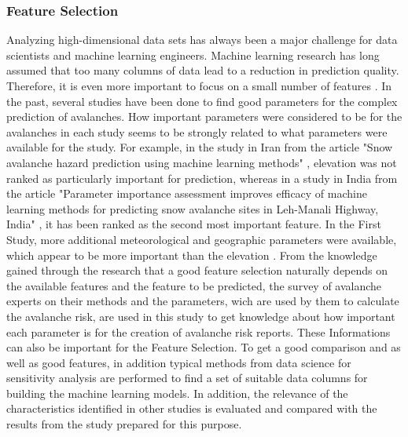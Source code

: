 \documentclass[12pt,a4paper]{article}
\begin{document}
\subsubsection{Feature Selection}
Analyzing high-dimensional data sets has always been a major challenge for data scientists and machine learning engineers. Machine learning research has long assumed that too many columns of data lead to a reduction in prediction quality. Therefore, it is even more important to focus on a small number of features \autocites{CAI201870}. 
In the past, several studies have been done to find good parameters for the complex prediction of avalanches. 
How important parameters were considered to be for the avalanches in each study seems to be strongly related to what parameters were available for the study. 
For example, in the study in Iran from the article "Snow avalanche hazard prediction using machine learning methods" \autocite{Bahram:2019}, elevation was not ranked as particularly important for prediction, whereas in a study in India from the article "Parameter importance assessment improves efficacy of machine learning methods for predicting snow avalanche sites in Leh-Manali Highway, India" \autocite[]{Tiwari:2021}, it has been ranked as the second most important feature. 
In the First Study, more additional meteorological and geographic parameters were available, which appear to be more important than the elevation \autocite{Bahram:2019} \autocite{Tiwari:2021}. 
From the knowledge gained through the research that a good feature selection naturally depends on the available features and the feature to be predicted, the survey of avalanche experts on their methods and the parameters, wich are used by them to calculate the avalanche risk, are used in this study to get knowledge about how important each parameter is for the creation of avalanche risk reports. These Informations can also be important for the Feature Selection.
To get a good comparison and as well as good features, in addition typical methods from data science for sensitivity analysis are performed to find a set of suitable data columns for building the machine learning models. 
In addition, the relevance of the characteristics identified in other studies is evaluated and compared with the results from the study prepared for this purpose.
\end{document}
